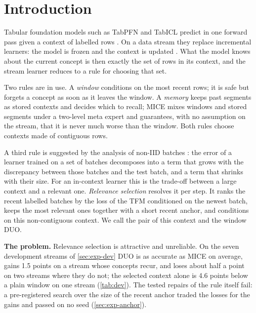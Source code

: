 \documentclass{article}
\theoremstyle{plain}
\theoremstyle{definition}
\theoremstyle{remark}
\newcommand{\mice}{\textsc{MICE}}
\newcommand{\duo}{\textsc{DUO}}
\begin{document}
\section{Introduction}
\label{sec:intro}

Tabular foundation models such as TabPFN \citep{hollmann2025tabpfn} and TabICL \citep{qu2025tabicl} predict in one
forward pass given a context of labelled rows \citep{muller2022pfn,nagler2023statistical}. On a data stream they
replace incremental learners: the model is frozen and the context is updated \citep{lourenco2026streams}. What the
model knows about the current concept is then exactly the set of rows in its context, and the stream learner reduces
to a rule for choosing that set.

Two rules are in use. A \emph{window} conditions on the most recent rows; it is safe but forgets a concept as soon as
it leaves the window. A \emph{memory} keeps past segments as stored contexts and decides which to recall; \mice{}
\citep{mice2026} mixes windows and stored segments under a two-level meta expert and guarantees, with no assumption
on the stream, that it is never much worse than the window. Both rules choose contexts made of contiguous rows.

A third rule is suggested by the analysis of non-IID batches \citep{zhao2024wnb}: the error of a learner trained on
a set of batches decomposes into a term that grows with the discrepancy between those batches and the test batch,
and a term that shrinks with their size. For an in-context learner this is the trade-off between a large context and
a relevant one. \emph{Relevance selection} resolves it per step. It ranks the recent labelled batches by the loss of
the TFM conditioned on the newest batch, keeps the most relevant ones together with a short recent anchor, and
conditions on this non-contiguous context. We call the pair of this context and the window \duo{}.

\textbf{The problem.} Relevance selection is attractive and unreliable. On the seven development streams of
\cref{sec:exp-dev} \duo{} is as accurate as \mice{} on average, gains 1.5 points on a stream whose concepts recur,
and loses about half a point on two streams where they do not; the selected context alone is 4.6 points below a
plain window on one stream (\cref{tab:dev}). The tested repairs of the rule itself fail: a pre-registered search over the size
of the recent anchor traded the losses for the gains and passed on no seed (\cref{sec:exp-anchor}).
\end{document}
